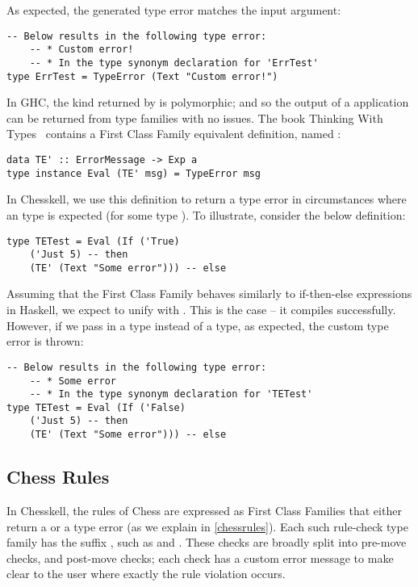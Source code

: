 As expected, the generated type error matches the input  argument:

\begin{lstlisting}
-- Below results in the following type error:
    -- * Custom error!
    -- * In the type synonym declaration for 'ErrTest'
type ErrTest = TypeError (Text "Custom error!")
\end{lstlisting}

In GHC, the kind returned by  is polymorphic; and so the output of a  application can be returned from type families with no issues. The book Thinking With Types~\cite{twt} contains a First Class Family equivalent definition, named :

\begin{lstlisting}
data TE' :: ErrorMessage -> Exp a
type instance Eval (TE' msg) = TypeError msg
\end{lstlisting}

In Chesskell, we use this definition to return a type error in circumstances where an  type is expected (for some type ). To illustrate, consider the below definition:

\begin{lstlisting}
type TETest = Eval (If ('True)
    ('Just 5) -- then
    (TE' (Text "Some error"))) -- else
\end{lstlisting}

Assuming that the  First Class Family behaves similarly to if-then-else expressions in Haskell, we expect  to unify with . This is the case -- it compiles successfully. However, if we pass in a  type instead of a  type, as expected, the custom type error is thrown:

\begin{lstlisting}
-- Below results in the following type error:
    -- * Some error
    -- * In the type synonym declaration for 'TETest'
type TETest = Eval (If ('False)
    ('Just 5) -- then
    (TE' (Text "Some error"))) -- else
\end{lstlisting}

\subsection{Chess Rules}

In Chesskell, the rules of Chess are expressed as First Class Families that either return a  or a type error (as we explain in \cref{chessrules}). Each such rule-check type family has the suffix , such as  and . These checks are broadly split into pre-move checks, and post-move checks; each check has a custom error message to make clear to the user where exactly the rule violation occurs.

